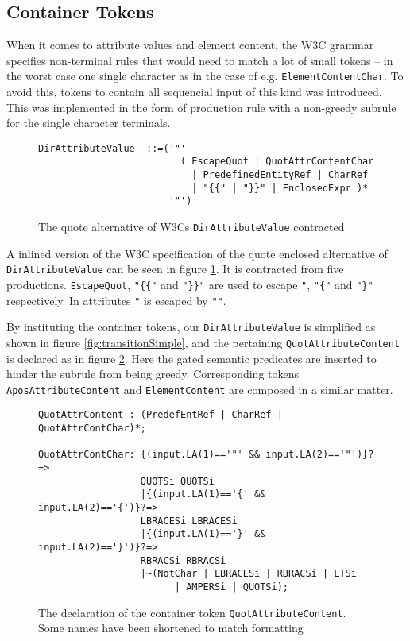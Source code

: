 \subsection{Container Tokens}
\label{sect:rewriteGrammar:containerTokens}
When it comes to attribute values and element content, the W3C grammar
specifies non-terminal rules that would need to match a lot of small tokens -- in the worst case one single character as in the case of e.g. \verb!ElementContentChar!. To avoid this, tokens to contain all sequencial input of this kind was introduced. This was implemented in the form of production rule with a non-greedy subrule for the single character terminals. 

\begin{figure}[h!]
\begin{Verbatim}
DirAttributeValue  ::=('"' 
                         ( EscapeQuot | QuotAttrContentChar
                           | PredefinedEntityRef | CharRef 
                           | "{{" | "}}" | EnclosedExpr )* 
                       '"')
\end{Verbatim}
\caption[W3Cs \texttt{DirAttributeValue} contracted]{The quote alternative of W3Cs \texttt{DirAttributeValue} contracted}
\label{fig:contractAttribute}
\end{figure}

A inlined version of the W3C specification of the quote enclosed alternative of \verb!DirAttributeValue! can be seen in figure \ref{fig:contractAttribute}. It is contracted from five productions. \verb!EscapeQuot!, \verb!"{{"! and \verb!"}}"! are used to escape \verb!"!, \verb!"{"! and \verb!"}"! respectively. In attributes \verb!"! is escaped by \verb!""!. 

By instituting the container tokens, our \verb!DirAttributeValue! is simplified as shown in figure \ref{fig:transitionSimple}, and the pertaining \verb!QuotAttributeContent! is declared as in figure \ref{fig:containerToken}. Here the gated semantic predicates are inserted to hinder the subrule from being greedy. Corresponding tokens \verb!AposAttributeContent! and \verb!ElementContent! are composed in a similar matter.

\begin{figure}[h!]
\begin{Verbatim}
QuotAttrContent : (PredefEntRef | CharRef | QuotAttrContChar)*;

QuotAttrContChar: {(input.LA(1)=='"' && input.LA(2)=='"')}?=> 
                  QUOTSi QUOTSi
                  |{(input.LA(1)=='{' && input.LA(2)=='{')}?=> 
                  LBRACESi LBRACESi 
                  |{(input.LA(1)=='}' && input.LA(2)=='}')}?=> 
                  RBRACSi RBRACSi 
                  |~(NotChar | LBRACESi | RBRACSi | LTSi 
                        | AMPERSi | QUOTSi);
\end{Verbatim}
\caption[Example of container token]{The declaration of the container token \texttt{QuotAttributeContent}. Some names have been shortened to match formatting}
\label{fig:containerToken}
\end{figure}
